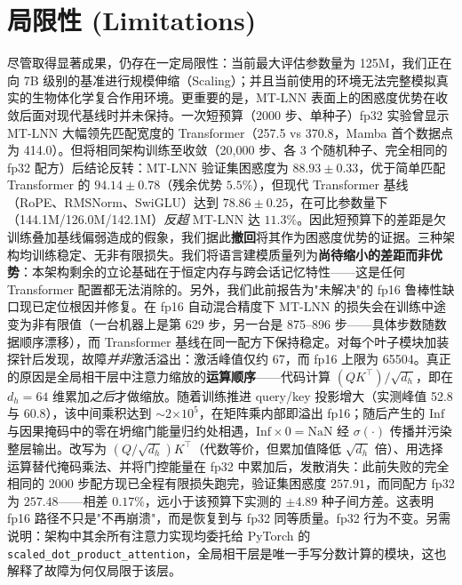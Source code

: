 \documentclass[11pt]{article}
\theoremstyle{definition}
\begin{document}
\section{局限性 (Limitations)}
\label{sec:limitations}

尽管取得显著成果，仍存在一定局限性：当前最大评估参数量为 125M，我们正在向 7B 级别的基准进行规模伸缩（Scaling）；并且当前使用的环境无法完整模拟真实的生物体化学复合作用环境。更重要的是，MT-LNN 表面上的困惑度优势在收敛后面对现代基线时并未保持。一次短预算（2000 步、单种子）fp32 实验曾显示 MT-LNN 大幅领先匹配宽度的 Transformer（257.5 vs 370.8，Mamba \citep{gu2023mamba} 首个数据点为 414.0）。但将相同架构训练至收敛（20{,}000 步、各 3 个随机种子、完全相同的 fp32 配方）后结论反转：MT-LNN 验证集困惑度为 $88.93 \pm 0.33$，优于简单匹配 Transformer 的 $94.14 \pm 0.78$（残余优势 $5.5\%$），但现代 Transformer 基线（RoPE、RMSNorm、SwiGLU）达到 $78.86 \pm 0.25$，在可比参数量下（144.1M/126.0M/142.1M）\emph{反超} MT-LNN 达 $11.3\%$。因此短预算下的差距是欠训练叠加基线偏弱造成的假象，我们据此\textbf{撤回}将其作为困惑度优势的证据。三种架构均训练稳定、无非有限损失。我们将语言建模质量列为\textbf{尚待缩小的差距而非优势}：本架构剩余的立论基础在于恒定内存与跨会话记忆特性——这是任何 Transformer 配置都无法消除的。另外，我们此前报告为"未解决"的 fp16 鲁棒性缺口现已定位根因并修复。在 fp16 自动混合精度下 MT-LNN 的损失会在训练中途变为非有限值（一台机器上是第 629 步，另一台是 875--896 步——具体步数随数据顺序漂移），而 Transformer 基线在同一配方下保持稳定。对每个叶子模块加装探针后发现，故障\emph{并非}激活溢出：激活峰值仅约 67，而 fp16 上限为 65504。真正的原因是全局相干层中注意力缩放的\textbf{运算顺序}——代码计算 $(QK^\top)/\sqrt{d_h}$，即在 $d_h{=}64$ 维累加\emph{之后}才做缩放。随着训练推进 query/key 投影增大（实测峰值 52.8 与 60.8），该中间乘积达到 $\sim$2$\times10^5$，在矩阵乘内部即溢出 fp16；随后产生的 $\mathrm{Inf}$ 与因果掩码中的零在坍缩门能量归约处相遇，$\mathrm{Inf}\times 0=\mathrm{NaN}$ 经 $\sigma(\cdot)$ 传播并污染整层输出。改写为 $(Q/\sqrt{d_h})K^\top$（代数等价，但累加值降低 $\sqrt{d_h}$ 倍）、用选择运算替代掩码乘法、并将门控能量在 fp32 中累加后，发散消失：此前失败的完全相同的 2000 步配方现已全程有限损失跑完，验证集困惑度 $257.91$，而同配方 fp32 为 $257.48$——相差 $0.17\%$，远小于该预算下实测的 $\pm4.89$ 种子间方差。这表明 fp16 路径不只是"不再崩溃"，而是恢复到与 fp32 同等质量。fp32 行为不变。另需说明：架构中其余所有注意力实现均委托给 PyTorch 的 \texttt{scaled\_dot\_product\_attention}，全局相干层是唯一手写分数计算的模块，这也解释了故障为何仅局限于该层。
\end{document}
